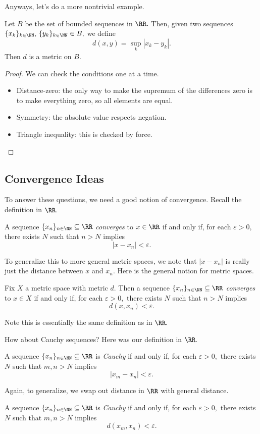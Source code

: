 Anyways, let's do a more nontrivial example.
\begin{exercise}[Ross 13.3]
	Let $B$ be the set of bounded sequences in $\RR.$ Then, given two sequences $\{x_k\}_{k\in\NN},\,\{y_k\}_{k\in\NN}\in B,$ we define
	\[d(x,y)=\sup_k|x_k-y_k|.\]
	Then $d$ is a metric on $B.$
\end{exercise}
\begin{proof}
	We can check the conditions one at a time.
	\begin{itemize}
		\item Distance-zero: the only way to make the supremum of the differences zero is to make everything zero, so all elements are equal.
		\item Symmetry: the absolute value respects negation.
		\item Triangle inequality: this is checked by force.
		\qedhere
	\end{itemize}
\end{proof}

\subsection{Convergence Ideas}
To answer these questions, we need a good notion of convergence. Recall the definition in $\RR.$
\begin{definition}
	A sequence $\{x_n\}_{n\in\NN}\subseteq\RR$ \textit{converges} to $x\in\RR$ if and only if, for each $\varepsilon>0,$ there exists $N$ such that $n>N$ implies
	\[|x-x_n|<\varepsilon.\]
\end{definition}
To generalize this to more general metric spaces, we note that $|x-x_n|$ is really just the distance between $x$ and $x_n.$ Here is the general notion for metric spaces.
\begin{definition}
	Fix $X$ a metric space with metric $d.$ Then a sequence $\{x_n\}_{n\in\NN}\subseteq\RR$ \textit{converges} to $x\in X$ if and only if, for each $\varepsilon>0,$ there exists $N$ such that $n>N$ implies
	\[d(x,x_n)<\varepsilon.\]
\end{definition}
Note this is essentially the same definition as in $\RR.$

How about Cauchy sequences? Here was our definition in $\RR.$
\begin{definition}
	A sequence $\{x_n\}_{n\in\NN}\subseteq\RR$ is \textit{Cauchy} if and only if, for each $\varepsilon>0,$ there exists $N$ such that $m,n>N$ implies
	\[|x_m-x_n|<\varepsilon.\]
\end{definition}
Again, to generalize, we swap out distance in $\RR$ with general distance.
\begin{definition}
	A sequence $\{x_n\}_{n\in\NN}\subseteq\RR$ is \textit{Cauchy} if and only if, for each $\varepsilon>0,$ there exists $N$ such that $m,n>N$ implies
	\[d(x_m,x_n)<\varepsilon.\]
\end{definition}

